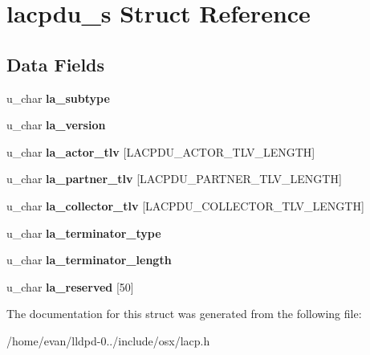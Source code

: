 \section{lacpdu\-\_\-s \-Struct \-Reference}
\label{structlacpdu__s}
\subsection*{\-Data \-Fields}
\begin{DoxyCompactItemize}
\item 
u\-\_\-char {\bfseries la\-\_\-subtype}\label{structlacpdu__s_ad2101eb253d60f5b5faec76d0e6c5dae}

\item 
u\-\_\-char {\bfseries la\-\_\-version}\label{structlacpdu__s_ac43e3e7ca0a3e32f2d6926bde634eac5}

\item 
u\-\_\-char {\bfseries la\-\_\-actor\-\_\-tlv} [\-L\-A\-C\-P\-D\-U\-\_\-\-A\-C\-T\-O\-R\-\_\-\-T\-L\-V\-\_\-\-L\-E\-N\-G\-T\-H]\label{structlacpdu__s_a833201ade04a7df262b3aa687991e52f}

\item 
u\-\_\-char {\bfseries la\-\_\-partner\-\_\-tlv} [\-L\-A\-C\-P\-D\-U\-\_\-\-P\-A\-R\-T\-N\-E\-R\-\_\-\-T\-L\-V\-\_\-\-L\-E\-N\-G\-T\-H]\label{structlacpdu__s_aa628357a24cb70b4771994d625baf085}

\item 
u\-\_\-char {\bfseries la\-\_\-collector\-\_\-tlv} [\-L\-A\-C\-P\-D\-U\-\_\-\-C\-O\-L\-L\-E\-C\-T\-O\-R\-\_\-\-T\-L\-V\-\_\-\-L\-E\-N\-G\-T\-H]\label{structlacpdu__s_aacc52ec5b860099298a2fec3ae1a7836}

\item 
u\-\_\-char {\bfseries la\-\_\-terminator\-\_\-type}\label{structlacpdu__s_aba63d39b72d2263f9738a4542e66a8a8}

\item 
u\-\_\-char {\bfseries la\-\_\-terminator\-\_\-length}\label{structlacpdu__s_aa5e008c7a09dcc6ba5160d43d365b74f}

\item 
u\-\_\-char {\bfseries la\-\_\-reserved} [50]\label{structlacpdu__s_ae2d5c03879128da695a1b42bee3ff271}

\end{DoxyCompactItemize}


\-The documentation for this struct was generated from the following file\-:\begin{DoxyCompactItemize}
\item 
/home/evan/lldpd-\/0../include/osx/lacp.\-h\end{DoxyCompactItemize}
